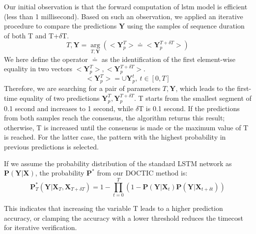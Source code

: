 \documentclass[review]{vgtc}                 %
\begin{document}
Our initial observation is that the forward computation of \acs{lstm} model is efficient (less than 1 millisecond).
Based on such an observation, we applied an iterative procedure to compare the predictions $\mathbf{Y}$ using the samples of sequence duration of both T and T+$\delta$T.
\begin{equation}
   T, \mathbf{Y} = \underset{T, \mathbf{Y}}{\arg} (<\mathbf{Y}_p^T> \doteq <\mathbf{Y}_p^{T+\delta T}>)
\end{equation}
We here define the operator $\doteq$ as the identification of the first element-wise equality in two vectors $<\mathbf{Y}_p^T>, <\mathbf{Y}_p^{T+\delta T}>$.
\begin{equation}
    <\mathbf{Y}_p^T> = \cup \mathbf{Y}_p^t,\ t \in [0, T]
\end{equation}
Therefore, we are searching for a pair of parameters $T, \mathbf{Y}$, which leads to the first-time equality of two predictions $\mathbf{Y}_p^T, \mathbf{Y}_p^{T+\delta T}$.
T starts from the smallest segment of 0.1 second and increases to 1 second, while $\delta$T is 0.1 second.
If the predictions from both samples reach the consensus, the algorithm returns this result; otherwise, T is increased until the consensus is made or the maximum value of T is reached.
For the latter case, the pattern with the highest probability in previous predictions is selected.

If we assume the probability distribution of the standard LSTM network as $\mathbf{P}(\mathbf{Y}|\mathbf{X})$,  the probability $\mathbf{P}^*$ from our DOCTIC method is:
\begin{equation}
\mathbf{P}^*_T(\mathbf{Y}|\mathbf{X}_T,\mathbf{X}_{T+\delta T}) = 1 - \prod_{t=0}^{T} (1 - \mathbf{P}(\mathbf{Y}|\mathbf{X}_t)\mathbf{P}(\mathbf{Y}|\mathbf{X}_{t+\delta t}))    
\end{equation}
    
This indicates that increasing the variable T leads to a higher prediction accuracy, or clamping the accuracy with a lower threshold reduces the timecost for iterative verification.     
\end{document}
